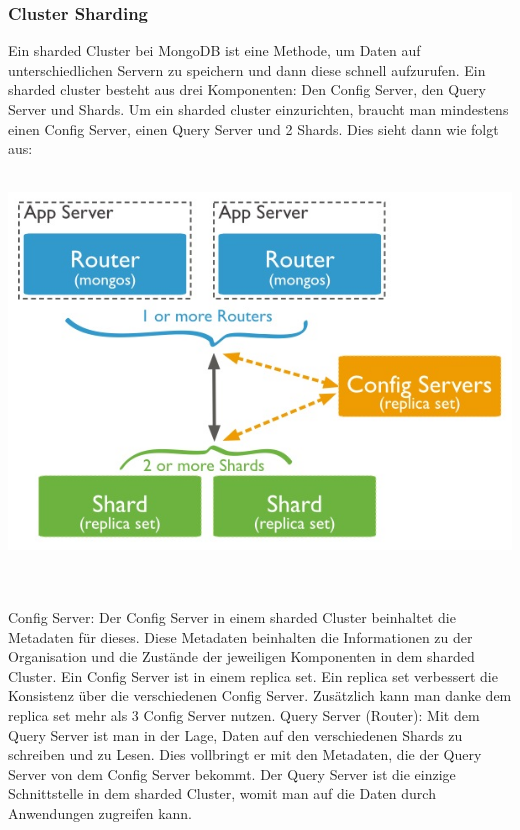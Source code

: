 \subsubsection{Cluster Sharding}
Ein sharded Cluster bei MongoDB ist eine Methode, um Daten auf unterschiedlichen Servern zu speichern und dann diese schnell aufzurufen. Ein sharded cluster besteht aus drei Komponenten: Den Config Server, den Query Server und Shards. Um ein sharded cluster einzurichten, braucht man mindestens einen Config Server, einen Query Server und 2 Shards. Dies sieht dann wie folgt aus:
\\
\\
\begin{minipage}{\textwidth}
    \centering
    \includegraphics[scale=1.0]{images/sharded-cluster-production-architecture.jpg}
    \label{fig:ver}
\end{minipage}
\\
\\
Config Server: Der Config Server in einem sharded Cluster beinhaltet die Metadaten für dieses. Diese Metadaten beinhalten die Informationen zu der Organisation und die Zustände der jeweiligen Komponenten in dem sharded Cluster.  Ein Config Server ist in einem replica set. Ein replica set verbessert die Konsistenz über die verschiedenen Config Server. Zusätzlich kann man danke dem replica set mehr als 3 Config Server nutzen.
Query Server (Router): Mit dem Query Server ist man in der Lage, Daten auf den verschiedenen Shards zu schreiben und zu Lesen. Dies vollbringt er mit den Metadaten, die der Query Server von dem Config Server bekommt. Der Query Server ist die einzige Schnittstelle in dem sharded Cluster, womit man auf die Daten durch Anwendungen zugreifen kann. 
